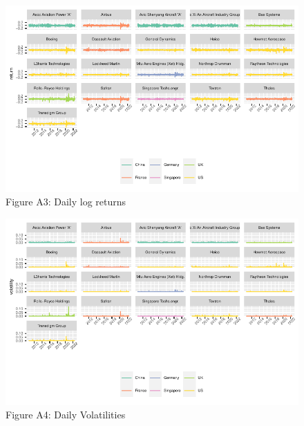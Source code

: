 \documentclass[
  letterpaper,
  DIV=11,
  numbers=noendperiod]{scrartcl}
\begin{document}
\begin{figure}[H]

{\centering \includegraphics{defenceRR_files/figure-pdf/fig-rtns-1.pdf}

}

\caption{\label{fig-rtns}Figure A3: Daily log returns}

\end{figure}

\begin{figure}[H]

{\centering \includegraphics{defenceRR_files/figure-pdf/fig-vols-1.pdf}

}

\caption{\label{fig-vols}Figure A4: Daily Volatilities}

\end{figure}
\end{document}
